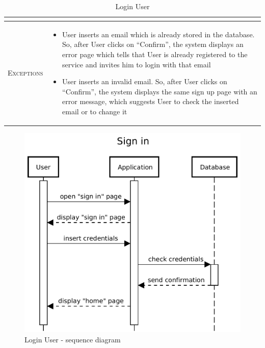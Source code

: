 \begin{table}[H]
\begin{tabular}[c]{|l|p{}|}
\begin{itemize}
    	\end{itemize}\\
    	\hline %
    	\textsc{Exceptions}         &  \begin{itemize}
    	    \item User inserts an email which is already stored in the database. So, after User clicks on “Confirm”, the system displays an error page which tells that User is already registered to the service and invites him to login with that email
            \item User inserts an invalid email. So, after User clicks on “Confirm”, the system displays the same sign up page with an error message, which suggests User to check the inserted email or to change it

    	\end{itemize}\\
    	\hline %
        
    \end{tabular}

 

    
    \caption{\label{tab:user_login}Login User}
\end{table}

\begin{figure}[H]
    \centering
    \includegraphics[scale=0.5]{Images/Sequence diagrams/User - sign in.pdf}

    \caption{Login User - sequence diagram}
    \label{fig:fig:seq_diag_sign_in}
\end{figure}

